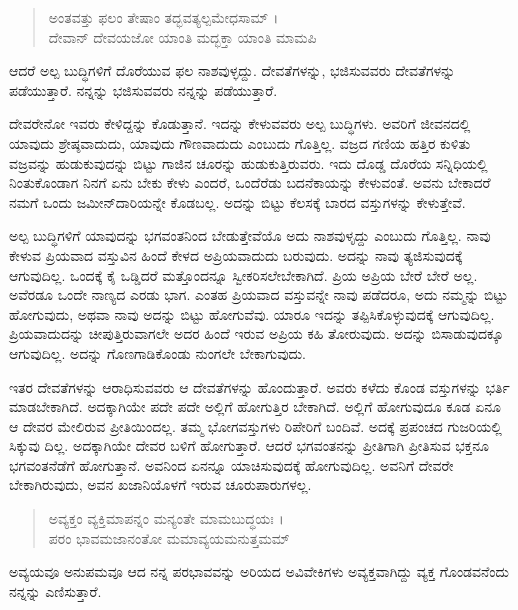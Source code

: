 \begin{verse}
ಅಂತವತ್ತು ಫಲಂ ತೇಷಾಂ ತದ್ಭವತ್ಯಲ್ಪಮೇಧಸಾಮ್ ।\\ದೇವಾನ್ ದೇವಯಜೋ ಯಾಂತಿ ಮದ್ಭಕ್ತಾ ಯಾಂತಿ ಮಾಮಪಿ 
\end{verse}

{\small ಆದರೆ ಅಲ್ಪ ಬುದ್ಧಿಗಳಿಗೆ ದೊರೆಯುವ ಫಲ ನಾಶವುಳ್ಳದ್ದು. ದೇವತೆಗಳನ್ನು, ಭಜಿಸುವವರು ದೇವತೆಗಳನ್ನು ಪಡೆಯುತ್ತಾರೆ. ನನ್ನನ್ನು ಭಜಿಸುವವರು ನನ್ನನ್ನು ಪಡೆಯುತ್ತಾರೆ.}

ದೇವರೇನೋ ಇವರು ಕೇಳಿದ್ದನ್ನು ಕೊಡುತ್ತಾನೆ. ಇದನ್ನು ಕೇಳುವವರು ಅಲ್ಪ ಬುದ್ಧಿಗಳು. ಅವರಿಗೆ ಜೀವನದಲ್ಲಿ ಯಾವುದು ಶ್ರೇಷ್ಠವಾದುದು, ಯಾವುದು ಗೌಣವಾದುದು ಎಂಬುದು ಗೊತ್ತಿಲ್ಲ. ವಜ್ರದ ಗಣಿಯ ಹತ್ತಿರ ಕುಳಿತು ವಜ್ರವನ್ನು ಹುಡುಕುವುದನ್ನು ಬಿಟ್ಟು ಗಾಜಿನ ಚೂರನ್ನು ಹುಡುಕುತ್ತಿರುವರು. ಇದು ದೊಡ್ಡ ದೊರೆಯ ಸನ್ನಿಧಿಯಲ್ಲಿ ನಿಂತುಕೊಂಡಾಗ ನಿನಗೆ ಏನು ಬೇಕು ಕೇಳು ಎಂದರೆ, ಒಂದೆರೆಡು ಬದನೆಕಾಯನ್ನು ಕೇಳುವಂತೆ. ಅವನು ಬೇಕಾದರೆ ನಮಗೆ ಒಂದು ಜಮೀನ್​ದಾರಿಯನ್ನೇ ಕೊಡಬಲ್ಲ. ಅದನ್ನು ಬಿಟ್ಟು ಕೆಲಸಕ್ಕೆ ಬಾರದ ವಸ್ತುಗಳನ್ನು ಕೇಳುತ್ತೇವೆ.

ಅಲ್ಪ ಬುದ್ಧಿಗಳಿಗೆ ಯಾವುದನ್ನು ಭಗವಂತನಿಂದ ಬೇಡುತ್ತೇವೆಯೊ ಅದು ನಾಶವುಳೃದ್ದು ಎಂಬುದು ಗೊತ್ತಿಲ್ಲ. ನಾವು ಕೇಳುವ ಪ್ರಿಯವಾದ ವಸ್ತುವಿನ ಹಿಂದೆ ಕೇಳದ ಅಪ್ರಿಯವಾದುದು ಬರುವುದು. ಅದನ್ನು ನಾವು ತ್ಯಜಿಸುವುದಕ್ಕೆ ಆಗುವುದಿಲ್ಲ. ಒಂದಕ್ಕೆ ಕೈ ಒಡ್ಡಿದರೆ ಮತ್ತೊಂದನ್ನೂ ಸ್ವೀಕರಿಸಲೇಬೇಕಾಗಿದೆ. ಪ್ರಿಯ ಅಪ್ರಿಯ ಬೇರೆ ಬೇರೆ ಅಲ್ಲ. ಅವೆರಡೂ ಒಂದೇ ನಾಣ್ಯದ ಎರಡು ಭಾಗ. ಎಂತಹ ಪ್ರಿಯವಾದ ವಸ್ತುವನ್ನೇ ನಾವು ಪಡೆದರೂ, ಅದು ನಮ್ಮನ್ನು ಬಿಟ್ಟು ಹೋಗುವುದು, ಅಥವಾ ನಾವು ಅದನ್ನು ಬಿಟ್ಟು ಹೋಗುವೆವು. ಯಾರೂ ಇದನ್ನು ತಪ್ಪಿಸಿಕೊಳ್ಳುವುದಕ್ಕೆ ಆಗುವುದಿಲ್ಲ. ಪ್ರಿಯವಾದುದನ್ನು ಚೀಪುತ್ತಿರುವಾಗಲೇ ಅದರ ಹಿಂದೆ ಇರುವ ಅಪ್ರಿಯ ಕಹಿ ತೋರುವುದು. ಅದನ್ನು ಬಿಸಾಡುವುದಕ್ಕೂ ಆಗುವುದಿಲ್ಲ. ಅದನ್ನು ಗೊಣಗಾಡಿಕೊಂಡು ನುಂಗಲೇ ಬೇಕಾಗುವುದು.

ಇತರ ದೇವತೆಗಳನ್ನು ಆರಾಧಿಸುವವರು ಆ ದೇವತೆಗಳನ್ನು ಹೊಂದುತ್ತಾರೆ. ಅವರು ಕಳೆದು ಕೊಂಡ ವಸ್ತುಗಳನ್ನು ಭರ್ತಿ ಮಾಡಬೇಕಾಗಿದೆ. ಅದಕ್ಕಾಗಿಯೇ ಪದೇ ಪದೇ ಅಲ್ಲಿಗೆ ಹೋಗುತ್ತಿರ ಬೇಕಾಗಿದೆ. ಅಲ್ಲಿಗೆ ಹೋಗುವುದೂ ಕೂಡ ಏನೂ ಆ ದೇವರ ಮೇಲಿರುವ ಪ್ರೀತಿಯಿಂದಲ್ಲ. ತಮ್ಮ ಭೋಗವಸ್ತುಗಳು ರಿಪೇರಿಗೆ ಬಂದಿವೆ. ಅದಕ್ಕೆ  ಪ್ರಪಂಚದ ಗುಜರಿಯಲ್ಲಿ ಸಿಕ್ಕುವು ದಿಲ್ಲ. ಅದಕ್ಕಾಗಿಯೇ ದೇವರ ಬಳಿಗೆ ಹೋಗುತ್ತಾರೆ. ಆದರೆ ಭಗವಂತನನ್ನು ಪ್ರೀತಿಗಾಗಿ ಪ್ರೀತಿಸುವ ಭಕ್ತನೂ ಭಗವಂತನೆಡೆಗೆ ಹೋಗುತ್ತಾನೆ. ಅವನಿಂದ ಏನನ್ನೂ ಯಾಚಿಸುವುದಕ್ಕೆ ಹೋಗುವುದಿಲ್ಲ. ಅವನಿಗೆ ದೇವರೇ ಬೇಕಾಗಿರುವುದು, ಅವನ ಖಜಾನಿಯೊಳಗೆ ಇರುವ ಚೂರುಪಾರುಗಳಲ್ಲ.

\begin{verse}
ಅವ್ಯಕ್ತಂ ವ್ಯಕ್ತಿಮಾಪನ್ನಂ ಮನ್ಯಂತೇ ಮಾಮಬುದ್ಧಯಃ ।\\ಪರಂ ಭಾವಮಜಾನಂತೋ ಮಮಾವ್ಯಯಮನುತ್ತಮಮ್ 
\end{verse}

{\small ಅವ್ಯಯವೂ ಅನುಪಮವೂ ಆದ ನನ್ನ ಪರಭಾವವನ್ನು ಅರಿಯದ ಅವಿವೇಕಿಗಳು ಅವ್ಯಕ್ತವಾಗಿದ್ದು ವ್ಯಕ್ತ ಗೊಂಡವನೆಂದು ನನ್ನನ್ನು ಎಣಿಸುತ್ತಾರೆ.}

